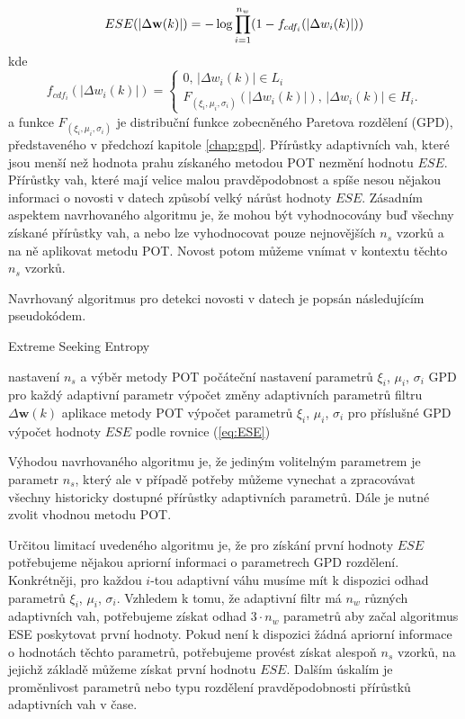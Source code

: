 \begin{equation}\label{eq:ese}
ESE(\lvert\Delta \textbf{w}(k)\rvert)=-\log \prod_{i=1}^{n_w}(1-f_{cdf_i}(\lvert\Delta w_i(k)\rvert))
\end{equation}
kde
\begin{equation}
  f_{cdf_i}(|\Delta w_i(k)|)=\begin{cases}
    0,\, |\Delta w_i(k)| \in L_i \\
    F_{(\xi_i,\mu_i,\sigma_i)}(|\Delta w_i(k)|),\, |\Delta w_i(k)| \in H_i.
  \end{cases}
\end{equation}
a funkce $F_{(\xi_i,\mu_i,\sigma_i)}$ je distribuční funkce zobecněného Paretova rozdělení (GPD), představeného v předchozí kapitole \ref{chap:gpd}. Přírůstky adaptivních vah, které jsou menší než hodnota prahu získaného metodou POT nezmění hodnotu $ESE$. Přírůstky vah, které mají velice malou pravděpodobnost a spíše nesou nějakou informaci o novosti v datech způsobí velký nárůst hodnoty $ESE$. Zásadním aspektem navrhovaného algoritmu je, že mohou být vyhodnocovány buď všechny získané přírůstky vah, a nebo lze vyhodnocovat pouze nejnovějších $n_s$ vzorků a na ně aplikovat metodu POT. Novost potom můžeme vnímat v kontextu těchto $n_s$ vzorků. 
\par
Navrhovaný algoritmus pro detekci novosti v datech je popsán následujícím pseudokódem.

\begin{algorithm}[H]
\caption{Extreme Seeking Entropy}
\begin{algorithmic}[1]\onehalfspacing
\STATE  nastavení $n_s$ a výběr metody POT
\STATE počáteční nastavení parametrů $\xi_i$, $\mu_i$, $\sigma_i$ GPD pro každý adaptivní parametr
\STATE výpočet změny adaptivních parametrů filtru $\Delta \textbf{w}(k)$
\STATE aplikace metody POT
\STATE výpočet parametrů $\xi_i$, $\mu_i$, $\sigma_i$ pro příslušné GPD
\ENDIF
\STATE výpočet hodnoty $ESE$ podle rovnice (\ref{eq:ESE})
\ENDFOR
\end{algorithmic}
\end{algorithm}

Výhodou navrhovaného algoritmu je, že jediným volitelným parametrem je parametr $n_s$, který ale v případě potřeby můžeme vynechat a zpracovávat všechny historicky dostupné přírůstky adaptivních parametrů. Dále je nutné zvolit vhodnou metodu POT.
\par
Určitou limitací uvedeného algoritmu je, že pro získání první hodnoty $ESE$ potřebujeme nějakou apriorní informaci o parametrech GPD rozdělení. Konkrétněji, pro každou $i$-tou adaptivní váhu musíme mít k dispozici odhad parametrů $\xi_i$, $\mu_i$, $\sigma_i$. Vzhledem k tomu, že adaptivní filtr má $n_w$ různých adaptivních vah, potřebujeme získat odhad $3\cdot n_w$ parametrů aby začal algoritmus ESE poskytovat první hodnoty. Pokud není k dispozici žádná apriorní informace o hodnotách těchto parametrů, potřebujeme provést získat alespoň $n_s$ vzorků, na jejichž základě můžeme získat první hodnotu $ESE$. Dalším úskalím je proměnlivost parametrů nebo typu rozdělení pravděpodobnosti přírůstků adaptivních vah v čase.